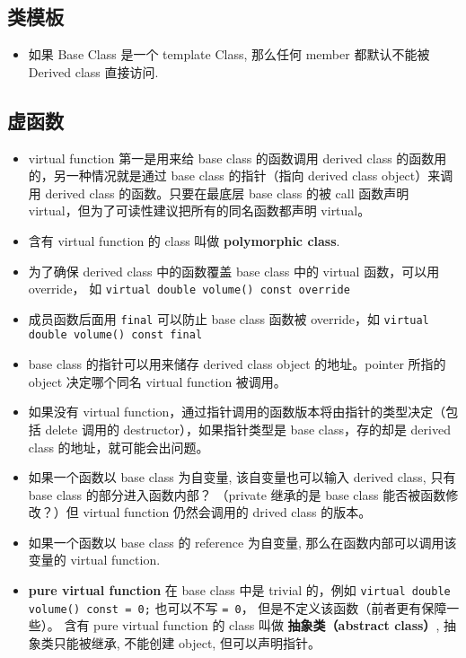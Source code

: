 \subsection{类模板}
\begin{itemize}
\item 如果 Base Class 是一个 template Class, 那么任何 member 都默认不能被 Derived class 直接访问.
\end{itemize}


\subsection{虚函数}
\begin{itemize}
\item virtual function 第一是用来给 base class 的函数调用 derived class 的函数用的，另一种情况就是通过 base class 的指针（指向 derived class object）来调用 derived class 的函数。只要在最底层 base class 的被 call 函数声明 virtual，但为了可读性建议把所有的同名函数都声明 virtual。
\item 含有 virtual function 的 class 叫做 \textbf{polymorphic class}.
\item 为了确保 derived class 中的函数覆盖 base class 中的 virtual 函数，可以用 override， 如 \verb|virtual double volume() const override|
\item 成员函数后面用 \verb|final| 可以防止 base class 函数被 override，如 \verb|virtual double volume() const final|
\item base class 的指针可以用来储存 derived class object 的地址。pointer 所指的 object 决定哪个同名 virtual function 被调用。
\item 如果没有 virtual function，通过指针调用的函数版本将由指针的类型决定（包括 delete 调用的 destructor），如果指针类型是 base class，存的却是 derived class 的地址，就可能会出问题。
\item 如果一个函数以 base class 为自变量, 该自变量也可以输入 derived class, 只有 base class 的部分进入函数内部？ （private 继承的是 base class 能否被函数修改？）但 virtual function 仍然会调用的 drived class 的版本。
\item 如果一个函数以 base class 的 reference 为自变量, 那么在函数内部可以调用该变量的 virtual function.
\item \textbf{pure virtual function} 在 base class 中是 trivial 的，例如 \verb|virtual double volume() const = 0;| 也可以不写 \verb|= 0|， 但是不定义该函数（前者更有保障一些）。 含有 pure virtual function 的 class 叫做 \textbf{抽象类（abstract class）}, 抽象类只能被继承, 不能创建 object,  但可以声明指针。

\end{itemize}

